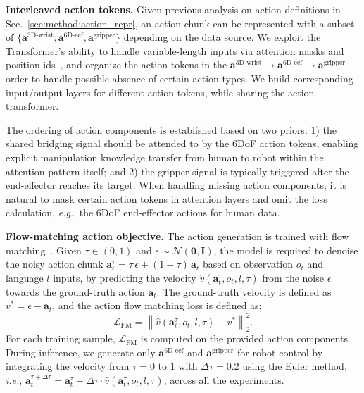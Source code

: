 \documentclass{llmxive}
\providecommand{\myparagraph}[1]{\vspace{0.1em}\noindent\textbf{#1}}
\begin{document}
\myparagraph{Interleaved action tokens.}
%
Given previous analysis on action definitions in Sec.~\ref{sec:method:action_repr}, an action chunk can be represented with a subset of $\{\mathbf{a}^{\text{3D-wrist}},\mathbf{a}^{\text{6D-eef}},\mathbf{a}^{\text{gripper}}\}$ depending on the data source. 
% 
We exploit the Transformer's ability to handle variable-length inputs via attention masks and position ids~\cite{vaswani2017attention}, and organize the action tokens in the
$\mathbf{a}^{\text{3D-wrist}} \rightarrow \mathbf{a}^{\text{6D-eef}} \rightarrow \mathbf{a}^{\text{gripper}}$ order to handle possible absence of certain action types.
% 
We build corresponding input/output layers for different action tokens, while sharing the action transformer.



The ordering of action components is established based on two priors: 
% 
1) the shared bridging signal should be attended to by the 6DoF action tokens, enabling explicit manipulation knowledge transfer from human to robot within the attention pattern itself; 
% 
and 2) the gripper signal is typically triggered after the end-effector reaches its target.
% 
When handling missing action components, it is natural to mask certain action tokens in attention layers and omit the loss calculation, \textit{e.g.}, the 6DoF end-effector actions for human data.




\myparagraph{Flow-matching action objective.}
%
The action generation is trained with flow matching~\cite{lipman2022flow,liu2022flow}. 
% 
Given $\tau\!\in\!(0,1)$ and $\epsilon\!\sim\!\mathcal{N}(\mathbf{0}, \mathbf{I})$, the model is required to denoise the noisy action chunk $\mathbf{a}^{\tau}_{t} = \tau\,\epsilon + (1-\tau)\,\mathbf{a}_{t}$ based on observation $o_t$ and language $l$ inputs, by predicting the velocity $\hat v(\mathbf{a}^{\tau}_t, o_t, l, \tau)$ from the noise $\epsilon$ towards the ground-truth action $\mathbf{a}_{t}$.
% 
The ground-truth velocity is defined as $v^* = \epsilon - \mathbf{a}_{t}$, and the action flow matching loss is defined as:
%
\begin{equation}
    \mathcal{L}_{\text{FM}} = \left\|\hat v(\mathbf{a}^{\tau}_{t}, o_t, l, \tau) - v^*\right\|_2^2.
\end{equation}
%
For each training sample, $\mathcal{L}_{\text{FM}}$ is computed on the provided action components. 
% 
During inference, we generate only $\mathbf{a}^{\text{6D-eef}}$ and $\mathbf{a}^{\text{gripper}}$ for robot control by integrating the velocity from $\tau\!=\!0$ to $1$ with $\Delta \tau = 0.2$ using the Euler method, \textit{i.e.}, $\mathbf{a}^{\tau + \Delta \tau}_{t} = \mathbf{a}^{\tau}_{t} + \Delta\tau \cdot \hat v(\mathbf{a}^{\tau}_{t}, o_t, l, \tau)$, across all the experiments.
% 
\end{document}
